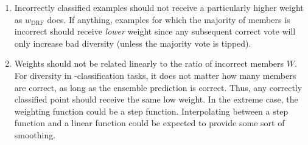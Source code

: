 \documentclass[../main.tex]{subfiles}
\begin{document}
\begin{enumerate}
    \item Incorrectly classified examples should not receive a particularly higher weight as $w_\text{DRF}$ does. If anything, examples for which the majority of members is incorrect should receive \textit{lower} weight since any subsequent correct vote will only increase bad diversity (unless the majority vote is tipped).
\item Weights should not be related linearly to the ratio of incorrect members $W$. For diversity in \zeroone-classification tasks, it does not matter how many members are correct, as long as the ensemble prediction is correct. Thus, any correctly classified point should receive the same low weight. In the extreme case, the weighting function could be a step function. Interpolating between a step function and a linear function could be expected to provide some sort of smoothing.
\end{enumerate}
\end{document}
